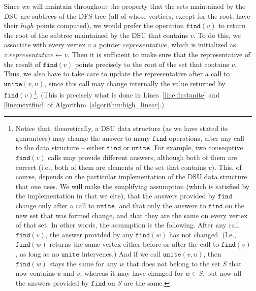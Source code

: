 \documentclass[11pt,a4paper]{article}
\begin{document}
Since we will maintain throughout the property that the sets maintained by the DSU are subtrees of the DFS tree (all of whose vertices, except for the root, have their $\mathit{high}$ points computed), we would prefer the operation $\mathtt{find}(v)$ to return the root of the subtree maintained by the DSU that contains $v$. To do this, we associate with every vertex $v$ a pointer $\mathit{representative}$, which is initialized as $v.\mathit{representative}\leftarrow v$. Then it is sufficient to make sure that the representative of the result of $\mathtt{find}(v)$ points precisely to the root of the set that contains $v$. Thus, we also have to take care to update the representative after a call to $\mathtt{unite}(v,u)$, since this call may change internally the value returned by $\mathtt{find}(v)$\footnote{Notice that, theoretically, a DSU data structure (as we have stated its guarantees) may change the answer to many $\mathtt{find}$ operations, after any call to the data structure -- either $\mathtt{find}$ or $\mathtt{unite}$. For example, two consequtive $\mathtt{find}(v)$ calls may provide different answers, although both of them are correct (i.e., both of them are elements of the set that contains $v$). This, of course, depends on the particular implementation of the DSU data structure that one uses. We will make the simplifying assumption (which is satisfied by the implementation in \cite{DBLP:journals/jcss/GabowT85} that we cite), that the answers provided by $\mathtt{find}$ change only after a call to $\mathtt{unite}$, and that only the answers to $\mathtt{find}$ on the new set that was formed change, and that they are the same on every vertex of that set. In other words, the assumption is the following. After any call $\mathtt{find}(v)$, the answer provided by any $\mathtt{find}(w)$ has not changed. (I.e., $\mathtt{find}(w)$ returns the same vertex either before or after the call to $\mathtt{find}(v)$, as long as no $\mathtt{unite}$ intervenes.) And if we call $\mathtt{unite}(v,u)$, then $\mathtt{find}(w)$ stays the same for any $w$ that does not belong to the set $S$ that now contains $u$ and $v$, whereas it may have changed for $w\in S$, but now all the answers provided by $\mathtt{find}$ on $S$ are the same.}. (This is precisely what is done in Lines~\ref{line:firstunite} and \ref{line:nextfind} of Algorithm~\ref{algorithm:high_linear}.)
\end{document}
